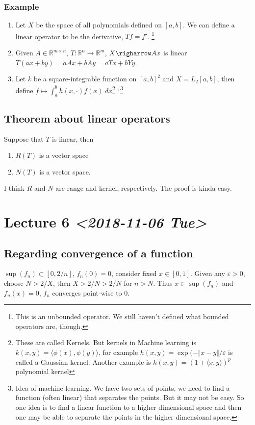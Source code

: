 \documentclass[11pt]{article}
\def\R{\mathbb{R}}
\begin{document}
\subsubsection{Example}
\label{sec:org6ae6a7d}
\begin{enumerate}
\item Let \(X\) be the space of all polynomials defined on \([a, b]\). We can define a
linear operator to be the derivative, \(Tf = f'\). \footnote{This is an unbounded operator. We still haven't defined what bounded
operators are, though.}
\item Given \(A \in \R^{m\times n}\), \(T \colon \R^n \rightarrow \R^m\), \(X
       \righarrow Ax\) is linear \(T(ax + by) = aAx + bAy = aTx + bYy\).
\item Let \(k\) be a square-integrable function on \([a, b]^2\) and \(X=L_2[a, b]\),
then define \(f\mapsto\int_{a}^{b} h(x, \cdot) f(x)\ dx\)\footnote{These are called Kernels. But kernels in Machine learning is \(k(x, y)
=\langle \phi(x), \phi(y)\rangle\), for example \(h(x, y) = \exp(-\Vert x -
y\Vert/\varepsilon\) is called a Gaussian kernel. Another example is \(h(x, y) =
(1+\langle x, y\rangle)^p\) polynomial kernel} \textsuperscript{,}\,\footnote{Idea of machine learning. We have two sets of points, we need to find a
function (often linear) that separates the points. But it may not be easy. So
one idea is to find a linear function to a higher dimensional space and then one
may be able to separate the points in the higher dimensional space.}
\end{enumerate}
\subsection{Theorem about linear operators}
\label{sec:org3453e52}
Suppose that \(T\) is linear, then
\begin{enumerate}
\item \(R(T)\) is a vector space
\item \(N(T)\) is a vector space.
\end{enumerate}

I think \(R\) and \(N\) are range and kernel, respectively. The proof is kinda
easy.
\section{Lecture 6 \textit{<2018-11-06 Tue>}}
\label{sec:orgb1cab7f}
\subsection{Regarding convergence of a function}
\label{sec:org39582a6}
\(\sup(f_n)\subset [0, 2/n]\), \(f_n(0) = 0\), consider fixed \(x\in [0, 1]\).
Given any \(\varepsilon > 0\), choose \(N > 2/X\), then \(X > 2/N > 2/N\) for
\(n>N\). Thus \(x \in \sup(f_n)\) and \(f_n(x) = 0\), \(f_n\) converges point-wise to
\(0\).
\end{document}
